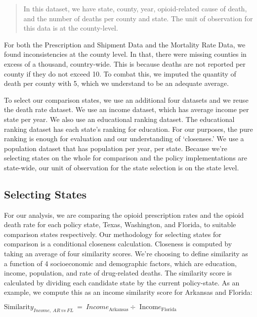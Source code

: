 \documentclass{article}
\begin{document}
\begin{quote}
In this dataset, we have state, county, year, opioid-related cause of
death, and the number of deaths per county and state. The unit of
observation for this data is at the county-level.
\end{quote}

For both the Prescription and Shipment Data and the Mortality Rate Data,
we found inconsistencies at the county level. In that, there were
missing counties in excess of a thousand, country-wide. This is because
deaths are not reported per county if they do not exceed 10. To combat
this, we imputed the quantity of death per county with 5, which we
understand to be an adequate average.

To select our comparison states, we use an additional four datasets and
we reuse the death rate dataset. We use an income dataset, which has
average income per state per year. We also use an educational ranking
dataset. The educational ranking dataset has each state's ranking for
education. For our purposes, the pure ranking is enough for evaluation
and our understanding of `closenses.' We use a population dataset that
has population per year, per state. Because we're selecting states on
the whole for comparison and the policy implementations are state-wide,
our unit of observation for the state selection is on the state level.

\hypertarget{selecting-states}{%
\subsection{Selecting States}\label{selecting-states}}

For our analysis, we are comparing the opioid prescription rates and the
opioid death rate for each policy state, Texas, Washington, and Florida,
to suitable comparison states respectively. Our methodology for
selecting states for comparison is a conditional closeness calculation.
Closeness is computed by taking an average of four similarity scores.
We're choosing to define similarity as a function of 4 socioeconomic and
demographic factors, which are education, income, population, and rate
of drug-related deaths. The similarity score is calculated by dividing
each candidate state by the current policy-state. As an example, we
compute this as an income similarity score for Arkansas and Florida:

\(\text{Similarit}y_{Income,\ AR\ vs\ FL}\  = \ Income_{\text{Arkansas}} \div \text{\ Incom}e_{\text{Florida}}\)
\end{document}
